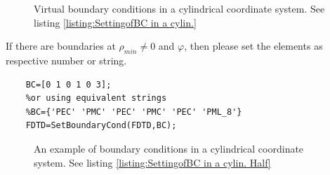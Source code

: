 \begin{itemize}
\begin{figure}[ht]
			  \caption[ Setting virtual boundary conditions in a cylindrical coordinate system]{Virtual boundary conditions in a cylindrical coordinate system. See listing \ref{listing:SettingofBC in a cylin.}}
			  \label{fig:Ex. SetBoundaryCond in cylin.}
		    \end{figure}
If there are boundaries at $\rho_{min}\neq0$ and $\varphi$, then please set the elements as respective number or string.
\begin{lstlisting}[caption={BC assignment in a cylindrical coordinate system as fig \ref{fig:Ex. SetBoundaryCond in cylin. Half}},label={listing:SettingofBC in a cylin. Half}]
	% no boundaries at rhomin=0 , phi_min and phi_max
	BC=[0 1 0 1 0 3];
	%or using equivalent strings
	%BC={'PEC' 'PMC' 'PEC' 'PMC' 'PEC' 'PML_8'} 
	FDTD=SetBoundaryCond(FDTD,BC); 
			\end{lstlisting} 
    \begin{figure}[H]
			  \centering
 \qquad
 \qquad 
			  \caption[ Setting  boundary conditions in a cylindrical coordinate system]{An example of boundary conditions in a cylindrical coordinate system. See listing \ref{listing:SettingofBC in a cylin. Half}}
			  \label{fig:Ex. SetBoundaryCond in cylin. Half}
		    \end{figure}
\end{itemize}
